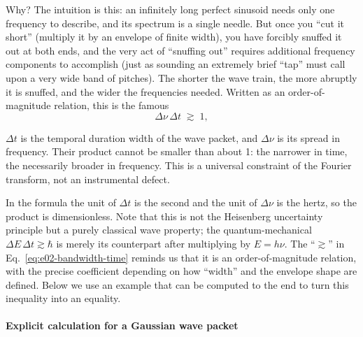 Why? The intuition is this: an infinitely long perfect sinusoid needs only one frequency to describe, and its spectrum is a single needle. But once you ``cut it short'' (multiply it by an envelope of finite width), you have forcibly snuffed it out at both ends, and the very act of ``snuffing out'' requires additional frequency components to accomplish (just as sounding an extremely brief ``tap'' must call upon a very wide band of pitches). The shorter the wave train, the more abruptly it is snuffed, and the wider the frequencies needed. Written as an order-of-magnitude relation, this is the famous
\begin{equation}
  \Delta\nu\,\Delta t \;\gtrsim\; 1 ,
  \label{eq:e02-bandwidth-time}
\end{equation}
\begin{formulaexplain}
\(\Delta t\) is the temporal duration width of the wave packet, and \(\Delta\nu\) is its spread in frequency. Their product cannot be smaller than about 1: the narrower in time, the necessarily broader in frequency. This is a universal constraint of the Fourier transform, not an instrumental defect.
\end{formulaexplain}
In the formula the unit of \(\Delta t\) is the second and the unit of \(\Delta\nu\) is the hertz, so the product is dimensionless. Note that this is not the Heisenberg uncertainty principle but a purely classical wave property; the quantum-mechanical \(\Delta E\,\Delta t\gtrsim\hbar\) is merely its counterpart after multiplying by \(E=h\nu\). The ``\(\gtrsim\)'' in Eq.~\eqref{eq:e02-bandwidth-time} reminds us that it is an order-of-magnitude relation, with the precise coefficient depending on how ``width'' and the envelope shape are defined. Below we use an example that can be computed to the end to turn this inequality into an equality.

\paragraph{Explicit calculation for a Gaussian wave packet}


